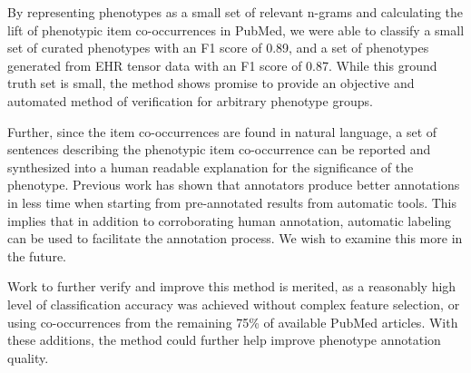 \documentclass{sig-alternate}
\begin{document}
By representing phenotypes as a small set of relevant n-grams and calculating the lift of phenotypic item co-occurrences in PubMed, we were able to classify a small set of curated phenotypes with an F1 score of 0.89, and a set of phenotypes generated from EHR tensor data with an F1 score of 0.87. While this ground truth set is small, the method shows promise to provide an objective and automated method of verification for arbitrary phenotype groups. 

Further, since the item co-occurrences are found in natural language, a set of sentences describing the phenotypic item co-occurrence can be reported and synthesized into a human readable explanation for the significance of the phenotype. 
Previous work \cite{neveol2011semi} has shown that annotators produce better annotations in less time when starting from pre-annotated results from automatic tools. 
This implies that in addition to corroborating human annotation, automatic labeling can be used to facilitate the annotation process. 
We wish to examine this more in the future.

Work to further verify and improve this method is merited, as a reasonably high level of classification accuracy was achieved without complex feature selection, or using co-occurrences from the remaining 75\% of available PubMed articles. With these additions, the method could further help improve phenotype annotation quality. 



%
%
%



\end{document}
